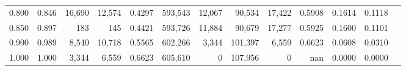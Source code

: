 \begin{tabular}{rrrrrrrrrrrrr}
0.800 & 0.846 & 16,690 & 12,574 &                                     0.4297 & 593,543 &  12,067 &  90,534 &  17,422 & 0.5908 & 0.1614 & 0.1118 \\
0.850 & 0.897 &    183 &    145 &                                     0.4421 & 593,726 &  11,884 &  90,679 &  17,277 & 0.5925 & 0.1600 & 0.1101 \\
0.900 & 0.989 &  8,540 & 10,718 &                                     0.5565 & 602,266 &   3,344 & 101,397 &   6,559 & 0.6623 & 0.0608 & 0.0310 \\
1.000 & 1.000 &  3,344 &  6,559 &                                     0.6623 & 605,610 &       0 & 107,956 &       0 &    nan & 0.0000 & 0.0000 \\
\bottomrule
\end{tabular}
